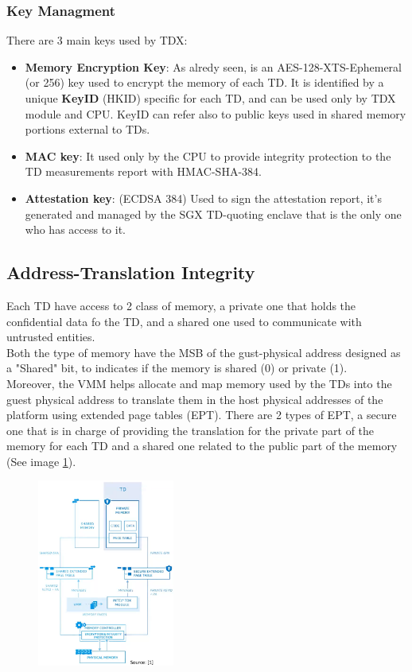 \subsubsection{Key Managment}
There are 3 main keys used by TDX:
\begin{itemize}
    \item \textbf{Memory Encryption Key}: As alredy seen, is an AES-128-XTS-Ephemeral (or 256) key used to encrypt the memory of each TD. 
            It is identified by a unique \textbf{KeyID} (HKID) specific for each TD, and can be used only by TDX module and CPU. KeyID can refer also to public keys used in shared memory portions external to TDs.
    \item \textbf{MAC key}: It used only by the CPU to provide integrity protection to the TD measurements report with HMAC-SHA-384.
    \item\textbf{ Attestation key}: (ECDSA 384) Used to sign the attestation report, it's generated and managed by the SGX TD-quoting enclave that is the only one who has access to it.
\end{itemize}

\subsection{Address-Translation Integrity}
Each TD have access to 2 class of memory, a private one that holds the confidential data fo the TD, and a shared one used to communicate with untrusted entities. \\
Both the type of memory have the MSB of the gust-physical address designed as a "Shared" bit, to indicates if the memory is shared (0) or private (1). \\
Moreover, the VMM helps allocate and map memory used by the TDs into the guest physical address to translate them in the host physical addresses of the platform using extended page tables (EPT). 
There are 2 types of EPT, a secure one that is in charge of providing the translation for the private part of the memory for each TD and a shared one related to the public part of the memory (See image \ref{fig:addrs transalation integrity}).

\begin{figure}[H]
    \centering
    \includegraphics[width=0.4\textwidth]{img/addrs transalation integrity.png}
    \label{fig:addrs transalation integrity}
\end{figure}

